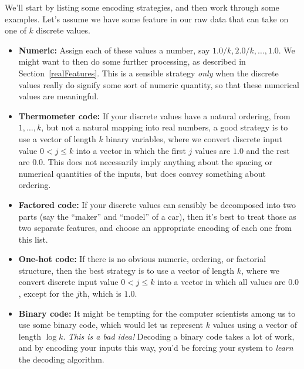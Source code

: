 We'll start by listing some encoding strategies, and then work through
some examples. Let's assume we have some feature in our raw data that
can take on one of $k$ discrete values.
\begin{itemize}
  \item{\bf Numeric:}  Assign each of these values a number, say $1.0/k,
          2.0/k, \ldots, 1.0$.  We might want to then do some further processing, as
        described in Section~\ref{realFeatures}.  This is a sensible
        strategy {\em only} when the discrete values really do signify some
        sort of numeric quantity, so that these numerical values are meaningful.

  \item{\bf Thermometer code:}  If your discrete values have a natural
        ordering, from $1, \ldots, k$, but not a natural mapping into real
        numbers, a good strategy is to use a vector of length $k$ binary
        variables, where we convert discrete input value $0 < j \leq k$ into
        a vector in which the first $j$ values are $1.0$ and the rest are
        $0.0$.  This does not necessarily imply anything about the spacing
        or numerical quantities of the inputs, but does convey something
        about ordering.

  \item{\bf Factored code:}  If your discrete values can sensibly be
        decomposed into two parts (say the ``maker'' and ``model'' of a car),
        then it's best to treat those as two separate features, and choose
        an appropriate encoding of each one from this list.

  \item{\bf One-hot code:}  If there is no obvious numeric, ordering, or
        factorial structure, then the best strategy is to use a vector of
        length $k$, where we convert discrete input value $0 < j \leq k$
        into a vector in which all values are $0.0$, except for the $j$th,
        which is $1.0$.

  \item{\bf Binary code:} It might be tempting for the computer
        scientists among us to use some binary code, which would let us
        represent $k$ values using a vector of length $\log k$.  {\em This
            is a bad idea!}  Decoding a binary code takes a lot of work, and
        by encoding your inputs this way, you'd be forcing your system to
          {\em learn} the decoding algorithm.
\end{itemize}


